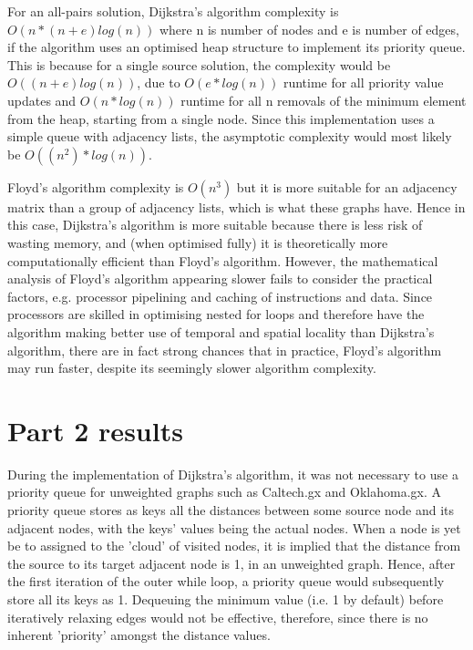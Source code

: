 \documentclass{article}
\begin{document}
For an all-pairs solution, Dijkstra's algorithm complexity is $O(n*(n+e)log(n))$
where n is number of nodes and e is number of edges, if the algorithm uses
an optimised heap structure to implement its priority queue. This is because
for a single source solution, the complexity would be $O((n+e)log(n))$, due to
$O(e*log(n))$ runtime for all priority value updates and $O(n*log(n))$ runtime
for all n removals of the minimum element from the heap, starting from a single
node. Since this implementation uses a simple queue with adjacency
lists, the asymptotic complexity would most likely be $O((n^2)*log(n))$.\par
\noindent Floyd's algorithm complexity is $O(n^3)$ but it is more suitable for
an adjacency matrix than a group of adjacency lists, which is what these graphs
have. Hence in this case, Dijkstra's algorithm is more suitable because there is
less risk of wasting memory, and (when optimised fully) it is theoretically
more computationally efficient than Floyd's algorithm. However, the mathematical
analysis of Floyd's algorithm appearing slower fails to consider the practical
factors, e.g. processor pipelining and caching of instructions and data. Since
processors are skilled in optimising nested for loops and therefore have the
algorithm making better use of temporal and spatial locality than Dijkstra's
algorithm, there are in fact strong chances that in practice, Floyd's algorithm
may run faster, despite its seemingly slower algorithm complexity.


\section{Part 2 results}
\label{sec:part2}
During the implementation of Dijkstra's algorithm, it was not necessary to use
a priority queue for unweighted graphs such as Caltech.gx and Oklahoma.gx.
A priority queue stores as keys all the distances between some source node and
its adjacent nodes, with the keys' values being the actual nodes. When a node is
yet be to assigned to the 'cloud' of visited nodes, it is implied that the
distance from the source to its target adjacent node is 1, in an unweighted
graph. Hence, after the first iteration of the outer while loop, a priority
queue would subsequently store all its keys as 1. Dequeuing the minimum
value (i.e. 1 by default) before iteratively relaxing edges would not be
effective, therefore, since there is no inherent 'priority' amongst the distance
values. \par
\end{document}
